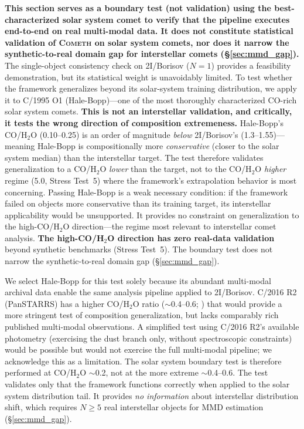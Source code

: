 \documentclass[usenatbib]{mnras}
\begin{document}
\textbf{This section serves as a boundary test (not validation) using the best-characterized solar system comet to verify that the pipeline executes end-to-end on real multi-modal data. It does not constitute statistical validation of \textsc{Cometh} on solar system comets, nor does it narrow the synthetic-to-real domain gap for interstellar comets (\S\ref{sec:mmd_gap}).} The single-object consistency check on 2I/Borisov ($N=1$) provides a feasibility demonstration, but its statistical weight is unavoidably limited. To test whether the framework generalizes beyond its solar-system training distribution, we apply it to C/1995 O1 (Hale-Bopp)---one of the most thoroughly characterized CO-rich solar system comets. \textbf{This is not an interstellar validation, and critically, it tests the wrong direction of composition extremeness.} Hale-Bopp's CO/H$_2$O (0.10--0.25) is an order of magnitude \textit{below} 2I/Borisov's (1.3--1.55)---meaning Hale-Bopp is compositionally more \textit{conservative} (closer to the solar system median) than the interstellar target. The test therefore validates generalization to a CO/H$_2$O \textit{lower} than the target, not to the CO/H$_2$O \textit{higher} regime (5.0, Stress Test~5) where the framework's extrapolation behavior is most concerning. Passing Hale-Bopp is a weak necessary condition: if the framework failed on objects more conservative than its training target, its interstellar applicability would be unsupported. It provides no constraint on generalization to the high-CO/H$_2$O direction---the regime most relevant to interstellar comet analysis. \textbf{The high-CO/H$_2$O direction has zero real-data validation} beyond synthetic benchmarks (Stress Test~5). The boundary test does not narrow the synthetic-to-real domain gap (\S\ref{sec:mmd_gap}).

We select Hale-Bopp for this test solely because its abundant multi-modal archival data \citep{bockelee04} enable the same analysis pipeline applied to 2I/Borisov. C/2016 R2 (PanSTARRS) has a higher CO/H$_2$O ratio ($\sim$0.4--0.6; \citealt{biver18}) that would provide a more stringent test of composition generalization, but lacks comparably rich published multi-modal observations. A simplified test using C/2016 R2's available photometry (exercising the dust branch only, without spectroscopic constraints) would be possible but would not exercise the full multi-modal pipeline; we acknowledge this as a limitation. The solar system boundary test is therefore performed at CO/H$_2$O $\sim$0.2, not at the more extreme $\sim$0.4--0.6. The test validates only that the framework functions correctly when applied to the solar system distribution tail. It provides \textit{no information} about interstellar distribution shift, which requires $N \geq 5$ real interstellar objects for MMD estimation (\S\ref{sec:mmd_gap}).
\end{document}
